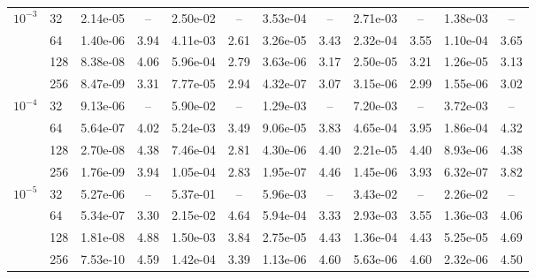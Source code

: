 \begin{table}[t]
\begin{tabular}{ll*{5}{rc}}
$10^{-3}$ & 32   & 2.14e-05 & --   & 2.50e-02 & --   & 3.53e-04 & --   & 2.71e-03 & --   & 1.38e-03 & --   \\
          & 64   & 1.40e-06 & 3.94 & 4.11e-03 & 2.61 & 3.26e-05 & 3.43 & 2.32e-04 & 3.55 & 1.10e-04 & 3.65 \\
          & 128  & 8.38e-08 & 4.06 & 5.96e-04 & 2.79 & 3.63e-06 & 3.17 & 2.50e-05 & 3.21 & 1.26e-05 & 3.13 \\
          & 256  & 8.47e-09 & 3.31 & 7.77e-05 & 2.94 & 4.32e-07 & 3.07 & 3.15e-06 & 2.99 & 1.55e-06 & 3.02 \\
$10^{-4}$ & 32   & 9.13e-06 & --   & 5.90e-02 & --   & 1.29e-03 & --   & 7.20e-03 & --   & 3.72e-03 & --   \\
          & 64   & 5.64e-07 & 4.02 & 5.24e-03 & 3.49 & 9.06e-05 & 3.83 & 4.65e-04 & 3.95 & 1.86e-04 & 4.32 \\
          & 128  & 2.70e-08 & 4.38 & 7.46e-04 & 2.81 & 4.30e-06 & 4.40 & 2.21e-05 & 4.40 & 8.93e-06 & 4.38 \\
          & 256  & 1.76e-09 & 3.94 & 1.05e-04 & 2.83 & 1.95e-07 & 4.46 & 1.45e-06 & 3.93 & 6.32e-07 & 3.82 \\
$10^{-5}$ & 32   & 5.27e-06 & --   & 5.37e-01 & --   & 5.96e-03 & --   & 3.43e-02 & --   & 2.26e-02 & --   \\
          & 64   & 5.34e-07 & 3.30 & 2.15e-02 & 4.64 & 5.94e-04 & 3.33 & 2.93e-03 & 3.55 & 1.36e-03 & 4.06 \\
          & 128  & 1.81e-08 & 4.88 & 1.50e-03 & 3.84 & 2.75e-05 & 4.43 & 1.36e-04 & 4.43 & 5.25e-05 & 4.69 \\
          & 256  & 7.53e-10 & 4.59 & 1.42e-04 & 3.39 & 1.13e-06 & 4.60 & 5.63e-06 & 4.60 & 2.32e-06 & 4.50 \\
\bottomrule
\end{tabular}
\end{table}
